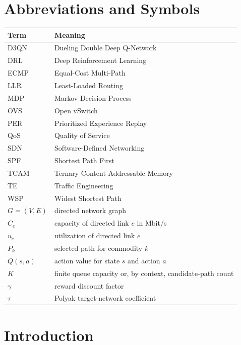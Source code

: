 \documentclass[12pt,a4paper,oneside]{report}
\begin{document}
\tableofcontents
\listoffigures
\listoftables

\chapter*{Abbreviations and Symbols}
\begin{longtable}{p{30mm}p{105mm}}
\toprule
\textbf{Term} & \textbf{Meaning}\\
\midrule
\endhead
D3QN & Dueling Double Deep Q-Network\\
DRL & Deep Reinforcement Learning\\
ECMP & Equal-Cost Multi-Path\\
LLR & Least-Loaded Routing\\
MDP & Markov Decision Process\\
OVS & Open vSwitch\\
PER & Prioritized Experience Replay\\
QoS & Quality of Service\\
SDN & Software-Defined Networking\\
SPF & Shortest Path First\\
TCAM & Ternary Content-Addressable Memory\\
TE & Traffic Engineering\\
WSP & Widest Shortest Path\\
$G=(V,E)$ & directed network graph\\
$C_e$ & capacity of directed link $e$ in Mbit/s\\
$u_e$ & utilization of directed link $e$\\
$P_k$ & selected path for commodity $k$\\
$Q(s,a)$ & action value for state $s$ and action $a$\\
$K$ & finite queue capacity or, by context, candidate-path count\\
$\gamma$ & reward discount factor\\
$\tau$ & Polyak target-network coefficient\\
\bottomrule
\end{longtable}

\clearpage
{}

\chapter{Introduction}
\label{chap:introduction}
\end{document}
